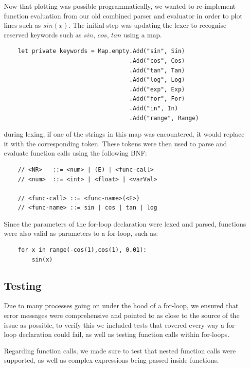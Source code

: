 \documentclass[a4paper, oneside, 11pt]{report}
\begin{document}
Now that plotting was possible programmatically, we wanted to re-implement function evaluation from our old combined parser and evaluator in order to plot lines such as $sin(x)$. The initial step was updating the lexer to recognise reserved keywords such as $sin$, $cos$, $tan$ using a map.

\begin{verbatim}
    let private keywords = Map.empty.Add("sin", Sin)
                                    .Add("cos", Cos)
                                    .Add("tan", Tan)
                                    .Add("log", Log)
                                    .Add("exp", Exp)
                                    .Add("for", For)
                                    .Add("in", In)
                                    .Add("range", Range)
\end{verbatim}

during lexing, if one of the strings in this map was encountered, it would replace it with the corresponding token. These tokens were then used to parse and evaluate function calls using the following BNF:

\begin{verbatim}
    // <NR>   ::= <num> | (E) | <func-call>
    // <num>  ::= <int> | <float> | <varVal>

    // <func-call> ::= <func-name>(<E>)
    // <func-name> ::= sin | cos | tan | log
\end{verbatim}

Since the parameters of the for-loop declaration were lexed and parsed, functions were also valid as parameters to a for-loop, such as:

\begin{verbatim}
    for x in range(-cos(1),cos(1), 0.01): 
        sin(x)
\end{verbatim}

\subsection{Testing}
Due to many processes going on under the hood of a for-loop, we ensured that error messages were comprehensive and pointed to as close to the source of the issue as possible, to verify this we included tests that covered every way a for-loop declaration could fail, as well as testing function calls within for-loops.

Regarding function calls, we made sure to test that nested function calls were supported, as well as complex expressions being passed inside functions.
\end{document}
